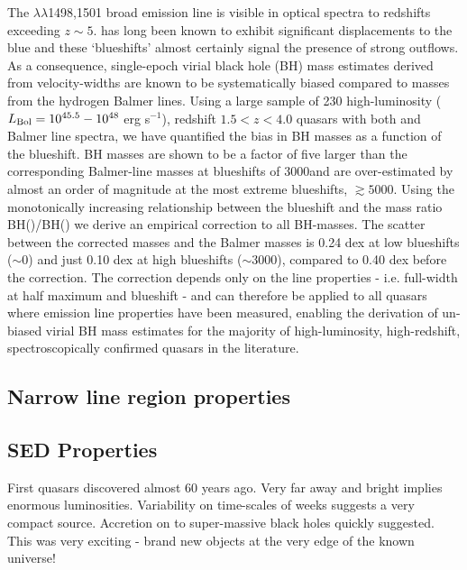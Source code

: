 The $\lambda\lambda$1498,1501 broad emission line is visible in optical spectra to redshifts exceeding $z\sim5$. 
 has long been known to exhibit significant displacements to the blue and these `blueshifts' almost certainly signal the presence of strong outflows.
As a consequence, single-epoch virial black hole (BH) mass estimates derived from  velocity-widths are known to be systematically biased compared to masses from the hydrogen Balmer lines. 
Using a large sample of 230 high-luminosity ($L_{\rm Bol} = 10^{45.5}-10^{48}$ erg s$^{-1}$), redshift $1.5 < z < 4.0$ quasars with both  and Balmer line spectra, we have quantified the bias in  BH masses as a function of the  blueshift. 
 BH masses are shown to be a factor of five larger than the corresponding Balmer-line masses at  blueshifts of 3000\kms and are over-estimated by almost an order of magnitude at the most extreme blueshifts, $\gtrsim 5000$\kms.
Using the monotonically increasing relationship between the  blueshift and the mass ratio BH()/BH(\hans) we derive an empirical correction to all  BH-masses.
The scatter between the corrected  masses and the Balmer masses is 0.24 dex at low  blueshifts ($\sim$0\kms) and just 0.10 dex at high blueshifts ($\sim$3000\kms), compared to 0.40 dex before the correction. 
The correction depends only on the  line properties - i.e. full-width at half maximum and blueshift - and can therefore be applied to all quasars where  emission line properties have been measured, enabling the derivation of un-biased virial BH mass estimates for the majority of high-luminosity, high-redshift, spectroscopically confirmed quasars in the literature.

\subsection{Narrow line region properties}

\subsection{SED Properties}



First quasars discovered almost 60 years ago.
Very far away and bright implies enormous luminosities. 
Variability on time-scales of weeks suggests a very compact source. 
Accretion on to super-massive black holes quickly suggested. 
This was very exciting - brand new objects at the very edge of the known universe!

